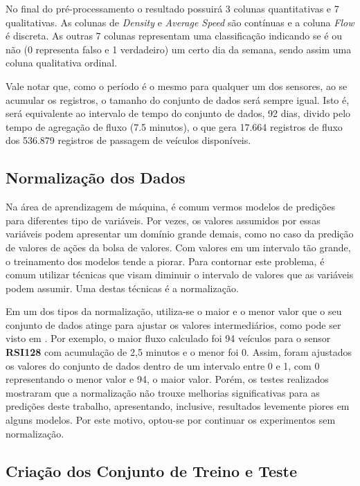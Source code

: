 No final do pré-processamento o resultado possuirá 3 colunas quantitativas e 7 qualitativas. As colunas de \textit{Density} e \textit{Average Speed} são contínuas e a coluna \textit{Flow} é discreta. As outras 7 colunas representam uma classificação indicando se é ou não (0 representa falso e 1 verdadeiro) um certo dia da semana, sendo assim uma coluna qualitativa ordinal.

Vale notar que, como o período é o mesmo para qualquer um dos sensores, ao se acumular os registros, o tamanho do conjunto de dados será sempre igual. Isto é, será equivalente ao intervalo de tempo do conjunto de dados, 92 dias, divido pelo tempo de agregação de fluxo (7.5 minutos), o que gera 17.664 registros de fluxo dos 536.879 registros de passagem de veículos disponíveis.

\subsection{Normalização dos Dados}

Na área de aprendizagem de máquina, é comum vermos modelos de predições para diferentes tipo de variáveis. Por vezes, os valores assumidos por essas variáveis podem apresentar um domínio grande demais, como no caso da predição de valores de ações da bolsa de valores. Com valores em um intervalo tão grande, o treinamento dos modelos tende a piorar. Para contornar este problema, é comum utilizar técnicas que visam diminuir o intervalo de valores que as variáveis podem assumir. Uma destas técnicas é a normalização. 

Em um dos tipos da normalização, utiliza-se o maior e o menor valor que o seu conjunto de dados atinge para ajustar os valores intermediários, como pode ser visto em \cite{Dorian_1999}. Por exemplo, o maior fluxo calculado foi 94 veículos para o sensor \textbf{RSI128} com acumulação de 2,5 minutos e o menor foi 0. Assim, foram ajustados os valores do conjunto de dados dentro de um intervalo entre 0 e 1, com 0 representando o menor valor e 94, o maior valor. Porém, os testes realizados mostraram que a normalização não trouxe melhorias significativas para as predições deste trabalho, apresentando, inclusive, resultados levemente piores em alguns modelos. Por este motivo, optou-se por continuar os experimentos sem normalização.

\subsection{Criação dos Conjunto de Treino e Teste}

